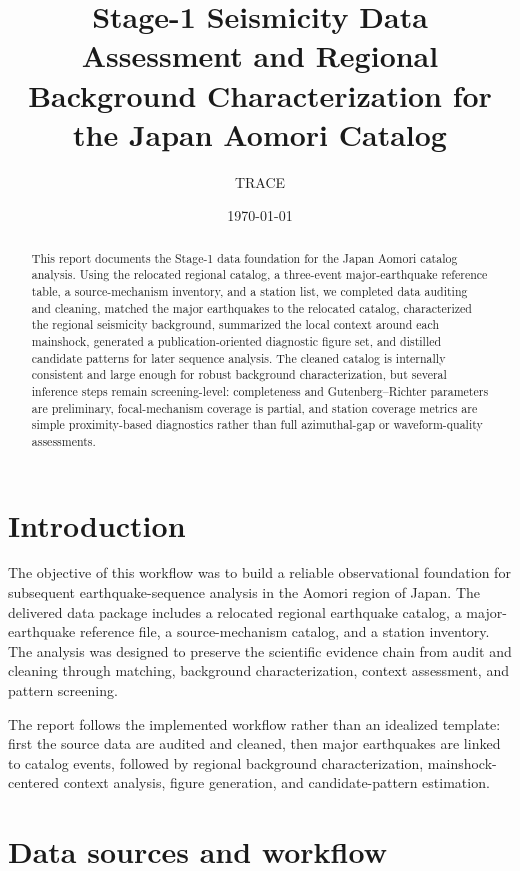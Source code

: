 \documentclass[11pt]{article}
\title{Stage-1 Seismicity Data Assessment and Regional Background Characterization for the Japan Aomori Catalog}
\author{TRACE}
\date{\today}
\begin{document}
\maketitle

\begin{abstract}
This report documents the Stage-1 data foundation for the Japan Aomori catalog analysis. Using the relocated regional catalog, a three-event major-earthquake reference table, a source-mechanism inventory, and a station list, we completed data auditing and cleaning, matched the major earthquakes to the relocated catalog, characterized the regional seismicity background, summarized the local context around each mainshock, generated a publication-oriented diagnostic figure set, and distilled candidate patterns for later sequence analysis. The cleaned catalog is internally consistent and large enough for robust background characterization, but several inference steps remain screening-level: completeness and Gutenberg--Richter parameters are preliminary, focal-mechanism coverage is partial, and station coverage metrics are simple proximity-based diagnostics rather than full azimuthal-gap or waveform-quality assessments.
\end{abstract}

\section{Introduction}
The objective of this workflow was to build a reliable observational foundation for subsequent earthquake-sequence analysis in the Aomori region of Japan. The delivered data package includes a relocated regional earthquake catalog, a major-earthquake reference file, a source-mechanism catalog, and a station inventory. The analysis was designed to preserve the scientific evidence chain from audit and cleaning through matching, background characterization, context assessment, and pattern screening.

The report follows the implemented workflow rather than an idealized template: first the source data are audited and cleaned, then major earthquakes are linked to catalog events, followed by regional background characterization, mainshock-centered context analysis, figure generation, and candidate-pattern estimation.

\section{Data sources and workflow}
\end{document}
